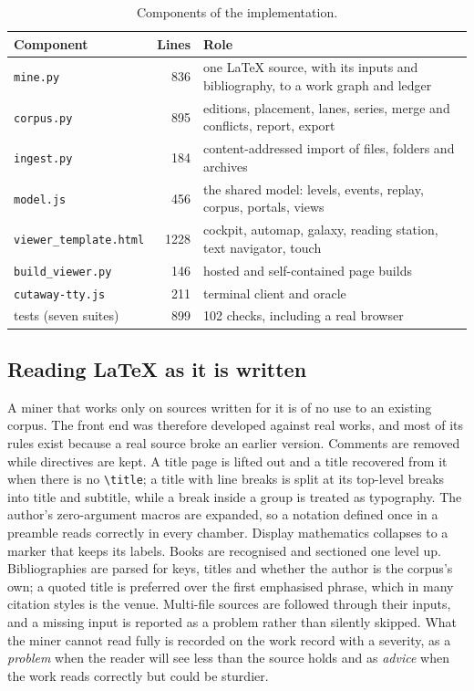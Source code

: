 \documentclass[11pt]{article}
\theoremstyle{remark}
\begin{document}
\begin{table}[htbp]
\centering\small
\begin{tabularx}{\linewidth}{lrX}
\toprule
Component & Lines & Role \\
\midrule
\texttt{mine.py} & 836 & one LaTeX source, with its inputs and bibliography, to a work graph and ledger \\
\texttt{corpus.py} & 895 & editions, placement, lanes, series, merge and conflicts, report, export \\
\texttt{ingest.py} & 184 & content-addressed import of files, folders and archives \\
\texttt{model.js} & 456 & the shared model: levels, events, replay, corpus, portals, views \\
\texttt{viewer\_template.html} & 1228 & cockpit, automap, galaxy, reading station, text navigator, touch \\
\texttt{build\_viewer.py} & 146 & hosted and self-contained page builds \\
\texttt{cutaway-tty.js} & 211 & terminal client and oracle \\
tests (seven suites) & 899 & 102 checks, including a real browser \\
\bottomrule
\end{tabularx}
\caption{Components of the implementation.}
\label{tab:components}
\end{table}

\subsection{Reading LaTeX as it is written}

A miner that works only on sources written for it is of no use to an existing corpus. The front end was therefore developed against real works, and most of its rules exist because a real source broke an earlier version. Comments are removed while directives are kept. A title page is lifted out and a title recovered from it when there is no \texttt{\textbackslash title}; a title with line breaks is split at its top-level breaks into title and subtitle, while a break inside a group is treated as typography. The author's zero-argument macros are expanded, so a notation defined once in a preamble reads correctly in every chamber. Display mathematics collapses to a marker that keeps its labels. Books are recognised and sectioned one level up. Bibliographies are parsed for keys, titles and whether the author is the corpus's own; a quoted title is preferred over the first emphasised phrase, which in many citation styles is the venue. Multi-file sources are followed through their inputs, and a missing input is reported as a problem rather than silently skipped. What the miner cannot read fully is recorded on the work record with a severity, as a \emph{problem} when the reader will see less than the source holds and as \emph{advice} when the work reads correctly but could be sturdier.
\end{document}
